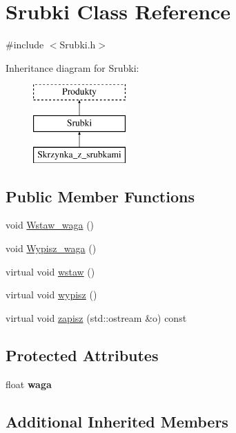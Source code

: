 \hypertarget{class_srubki}{}\section{Srubki Class Reference}
\label{class_srubki}


{\ttfamily \#include $<$Srubki.\+h$>$}

Inheritance diagram for Srubki\+:\begin{figure}[H]
\begin{center}
\leavevmode
\includegraphics[height=3.000000cm]{class_srubki}
\end{center}
\end{figure}
\subsection*{Public Member Functions}
\begin{DoxyCompactItemize}
\item 
void \mbox{\hyperlink{class_srubki_a24162b0853a08261b4a48e9821a22478}{Wstaw\+\_\+waga}} ()
\item 
void \mbox{\hyperlink{class_srubki_a63a36d27654a13af2f8223ac28b3eae3}{Wypisz\+\_\+waga}} ()
\item 
virtual void \mbox{\hyperlink{class_srubki_a129b7fcf23ad1928f196ca255aa66438}{wstaw}} ()
\item 
virtual void \mbox{\hyperlink{class_srubki_a0ac1f1ce5748283a13b0f554add73f0b}{wypisz}} ()
\item 
virtual void \mbox{\hyperlink{class_srubki_a2d8edbd9d8170f12378c750f634a7ecd}{zapisz}} (std\+::ostream \&o) const
\end{DoxyCompactItemize}
\subsection*{Protected Attributes}
\begin{DoxyCompactItemize}
\item 
\mbox{\label{class_srubki_aa9f5d21ee000de857932389c1919bb73}} 
float {\bfseries waga}
\end{DoxyCompactItemize}
\subsection*{Additional Inherited Members}


